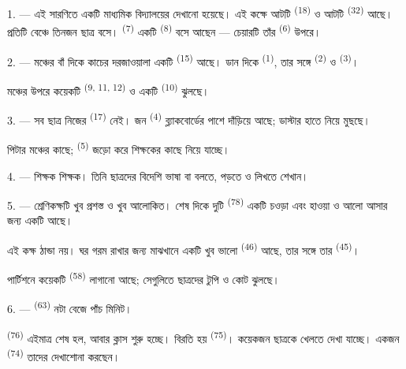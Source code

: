 \VUsaut{3.0mm}

1. --- এই সারণিতে একটি মাধ্যমিক বিদ্যালয়ের  দেখানো
হয়েছে। এই কক্ষে আটটি  \textsuperscript{(18)} ও আটটি
 \textsuperscript{(32)} আছে। প্রতিটি বেঞ্চে তিনজন ছাত্র বসে।
 \textsuperscript{(7)} একটি  \textsuperscript{(8)}
বসে আছেন — চেয়ারটি তাঁর  \textsuperscript{(6)} উপরে।

2. --- মঞ্চের বাঁ দিকে কাচের দরজাওয়ালা একটি 
\textsuperscript{(15)} আছে। ডান দিকে  \textsuperscript{(1)},
তার সঙ্গে  \textsuperscript{(2)} ও 
\textsuperscript{(3)}।

মঞ্চের উপরে কয়েকটি  \textsuperscript{(9, 11, 12)} ও একটি
 \textsuperscript{(10)} ঝুলছে।

3. --- সব ছাত্র নিজের  \textsuperscript{(17)} নেই। জন
\textsuperscript{(4)} ব্ল্যাকবোর্ডের পাশে দাঁড়িয়ে আছে; ডাস্টার হাতে নিয়ে
 মুছছে।

পিটার মঞ্চের কাছে;  \textsuperscript{(5)} জড়ো করে
শিক্ষকের কাছে নিয়ে যাচ্ছে।

4. ---  শিক্ষক  শিক্ষক। তিনি ছাত্রদের
বিদেশি ভাষা  বা
 বলতে, পড়তে ও লিখতে শেখান।

5. --- শ্রেণিকক্ষটি খুব প্রশস্ত ও খুব আলোকিত। শেষ দিকে দুটি
 \textsuperscript{(78)} একটি চওড়া  এবং হাওয়া
ও আলো আসার জন্য একটি  আছে।

এই কক্ষ ঠান্ডা নয়। ঘর গরম রাখার জন্য মাঝখানে একটি খুব ভালো
 \textsuperscript{(46)} আছে, তার সঙ্গে তার 
\textsuperscript{(45)}।

পার্টিশনে কয়েকটি  \textsuperscript{(58)} লাগানো আছে; সেগুলিতে
ছাত্রদের টুপি ও কোট ঝুলছে।

\VUsaut{5.2mm}
\VUsaut{3.6mm}

6. ---  \textsuperscript{(63)} নটা বেজে পাঁচ মিনিট।

 \textsuperscript{(76)} এইমাত্র শেষ হল, আবার ক্লাস শুরু হচ্ছে।
বিরতি হয়  \textsuperscript{(75)}। কয়েকজন ছাত্রকে খেলতে দেখা
যাচ্ছে। একজন  \textsuperscript{(74)} তাদের দেখাশোনা করছেন।

